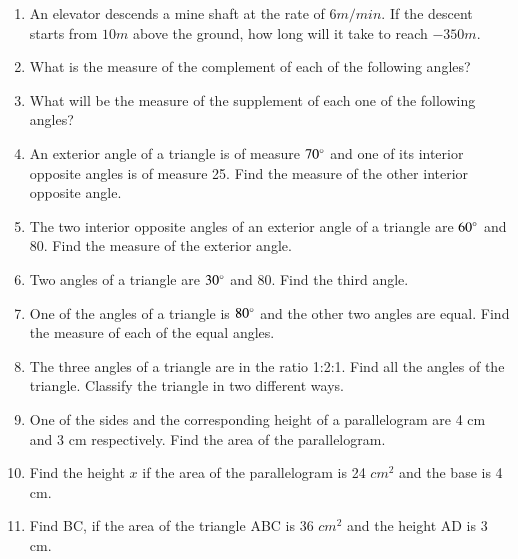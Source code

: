 \begin{enumerate}[label=\thesection.\arabic*, ref=\thesection.\theenumi,resume*]
\begin{enumerate}
		\end{enumerate}
	\item An elevator descends a mine shaft at the rate of $6m/min$.  If the descent starts from $10m$ above the ground, how long will it take to reach $-350m$.
	\item What is the measure of the complement of each of the following angles? 
		\begin{enumerate}
\end{enumerate}
\item What will be the measure of the supplement of each one of the following angles? 
		\begin{enumerate}
\end{enumerate}
\item An exterior angle of a triangle is of measure $70\degree$ and one of its interior opposite angles is of measure 25\degree. Find the measure of the other interior opposite angle.
\item The two interior opposite angles of an exterior angle of a triangle are $60\degree$ and 80\degree. Find the measure of the exterior angle.
\item 	Two angles of a triangle are $30\degree$ and 80\degree. Find the third angle. 
\item  One of the angles of a triangle is $80\degree$ and the other two angles are equal. Find the measure of each of the equal angles.
\item  The three angles of a triangle are in the ratio 1:2:1. Find all the angles of the triangle. Classify the triangle in two different ways.
\item One of the sides and the corresponding height of a parallelogram are 4 cm and 3 cm respectively. Find the area of the parallelogram.
\item Find the height $x$ if the area of the parallelogram is 24 $cm^2$ and the base is 4 cm.
\item Find BC, if the area of the triangle ABC is 36 $cm^2$ and the height AD is 3 cm.
		\end{enumerate}
